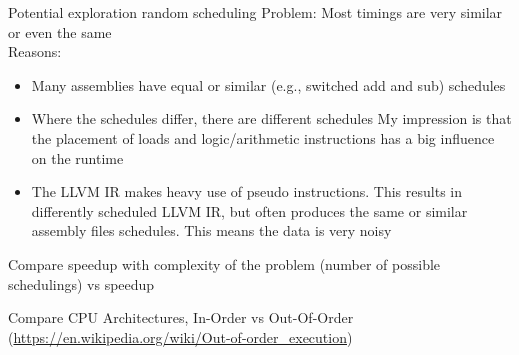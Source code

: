 Potential exploration \rightarrow random scheduling
Problem: Most timings are very similar or even the same \\
Reasons:
\begin{itemize}
    \item Many assemblies have equal or similar (e.g., switched add and sub) schedules
    \item Where the schedules differ, there are different schedules
    My impression is that the placement of loads and logic/arithmetic instructions has a big influence on the runtime
    \item The LLVM IR makes heavy use of pseudo instructions.
    This results in differently scheduled LLVM IR, but often produces the same or similar assembly files schedules.
    This means the data is very noisy
\end{itemize}

Compare speedup with complexity of the problem (number of possible schedulings) vs speedup

Compare CPU Architectures, In-Order vs Out-Of-Order (\url{https://en.wikipedia.org/wiki/Out-of-order_execution})

